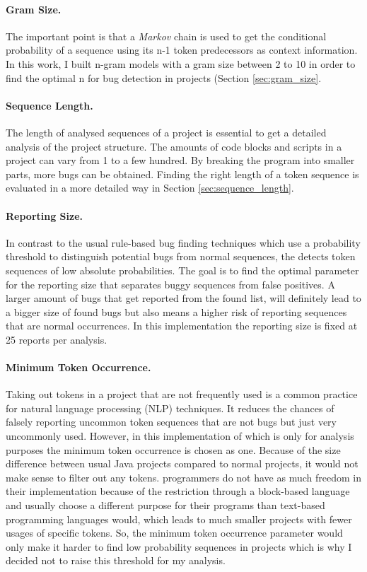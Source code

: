 \paragraph{Gram Size.}
The important point is that a \textit{Markov} chain is used to get the conditional probability of a sequence using its n-1 token predecessors as context information. In this work, I built n-gram models with a gram size between 2 to 10 in order to find the optimal n for bug detection in \scratch{} projects (Section \ref{sec:gram_size}. 
\paragraph{Sequence Length.}
The length of analysed sequences of a project is essential to get a detailed analysis of the project structure. The amounts of code blocks and scripts in a \scratch{} project can vary from 1 to a few hundred. By breaking the program into smaller parts, more bugs can be obtained. Finding the right length of a token sequence is evaluated in a more detailed way in Section \ref{sec:sequence_length}.
\paragraph{Reporting Size.}
In contrast to the usual rule-based bug finding techniques which use a probability threshold to distinguish potential bugs from normal sequences, the \ngram{} detects token sequences of low absolute probabilities. The goal is to find the optimal parameter for the reporting size that separates buggy sequences from false positives. A larger amount of bugs that get reported from the found list, will definitely lead to a bigger size of found bugs but also means a higher risk of reporting sequences that are normal occurrences. In this implementation the reporting size is fixed at 25 reports per analysis.
\paragraph{Minimum Token Occurrence.}
Taking out tokens in a project that are not frequently used is a common practice for natural language processing (NLP) techniques. It reduces the chances of falsely reporting uncommon token sequences that are not bugs but just very uncommonly used. However, in this implementation of \ngram{} which is only for \scratch{} analysis purposes the minimum token occurrence is chosen as one. Because of the size difference between usual Java projects compared to normal \scratch{} projects, it would not make sense to filter out any tokens. \scratch{} programmers do not have as much freedom in their implementation because of the restriction through a block-based language and usually choose a different purpose for their programs than text-based programming languages would, which leads to much smaller projects with fewer usages of specific tokens. So, the minimum token occurrence parameter would only make it harder to find low probability sequences in projects which is why I decided not to raise this threshold for my analysis.
